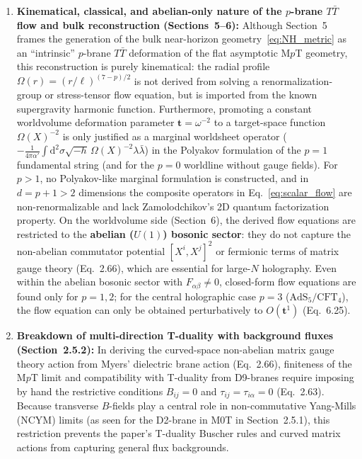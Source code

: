 \documentclass[11pt,a4paper]{article}
\newcommand{\dd}{\mathrm{d}}
\newcommand{\lambdap}{\boldsymbol{t}}
\begin{document}
\begin{enumerate}[label=(\alph*), leftmargin=1.8em]
    \item \textbf{Kinematical, classical, and abelian-only nature of the $p$-brane $T\bar{T}$ flow and bulk reconstruction (Sections~5--6):}
    Although Section~5 frames the generation of the bulk near-horizon geometry~\eqref{eq:NH_metric} as an ``intrinsic'' $p$-brane $T\bar{T}$ deformation of the flat asymptotic M$p$T geometry, this reconstruction is purely kinematical: the radial profile $\mathbb{\Omega}(r) = (r/\ell)^{(7-p)/2}$ is not derived from solving a renormalization-group or stress-tensor flow equation, but is imported from the known supergravity harmonic function. Furthermore, promoting a constant worldvolume deformation parameter $\lambdap = \omega^{-2}$ to a target-space function $\mathbb{\Omega}(X)^{-2}$ is only justified as a marginal worldsheet operator ($-\frac{1}{4\pi\alpha'}\int \dd^2\sigma\sqrt{-h}\,\mathbb{\Omega}(X)^{-2}\lambda\bar{\lambda}$) in the Polyakov formulation of the $p=1$ fundamental string (and for the $p=0$ worldline without gauge fields). For $p > 1$, no Polyakov-like marginal formulation is constructed, and in $d = p+1 > 2$ dimensions the composite operators in Eq.~\eqref{eq:scalar_flow} are non-renormalizable and lack Zamolodchikov's 2D quantum factorization property. On the worldvolume side (Section~6), the derived flow equations are restricted to the \textbf{abelian ($U(1)$) bosonic sector}: they do not capture the non-abelian commutator potential $[X^i, X^j]^2$ or fermionic terms of matrix gauge theory (Eq.~2.66), which are essential for large-$N$ holography. Even within the abelian bosonic sector with $F_{\alpha\beta} \neq 0$, closed-form flow equations are found only for $p=1,2$; for the central holographic case $p=3$ ($\text{AdS}_5/\text{CFT}_4$), the flow equation can only be obtained perturbatively to $O(\lambdap^1)$ (Eq.~6.25).

    \item \textbf{ Breakdown of multi-direction T-duality with background fluxes (Section~2.5.2):}
    In deriving the curved-space non-abelian matrix gauge theory action from Myers' dielectric brane action (Eq.~2.66), finiteness of the M$p$T limit and compatibility with T-duality from D9-branes require imposing by hand the restrictive conditions $B_{ij} = 0$ and $\tau_{ij} = \tau_{i\alpha} = 0$ (Eq.~2.63). Because transverse $B$-fields play a central role in non-commutative Yang-Mills (NCYM) limits (as seen for the D2-brane in M0T in Section~2.5.1), this restriction prevents the paper's T-duality Buscher rules and curved matrix actions from capturing general flux backgrounds.
\end{enumerate}
\end{document}
